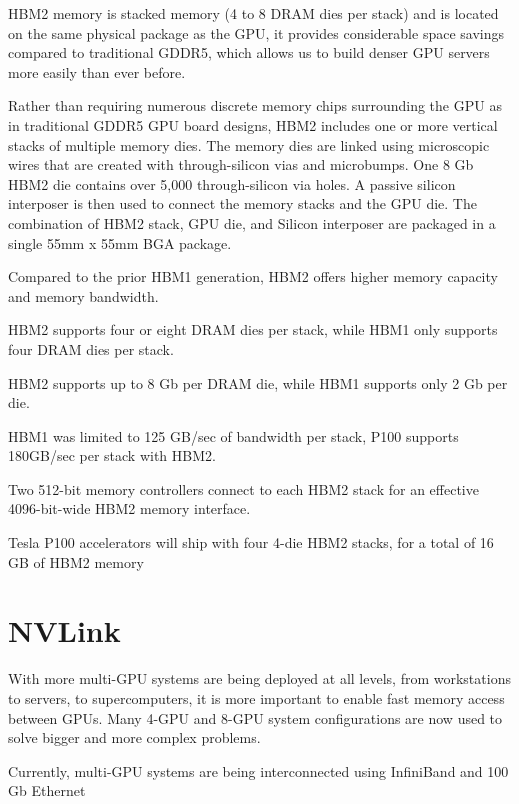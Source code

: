 HBM2 memory is stacked memory (4 to 8 DRAM dies per stack) and is located on the
same physical package as the GPU, it provides considerable space savings
compared to traditional GDDR5, which allows us to build denser GPU servers more
easily than ever before.

Rather than requiring numerous discrete memory chips surrounding the GPU as in
traditional GDDR5 GPU board designs, HBM2 includes one or more vertical stacks
of multiple memory dies. The memory dies are linked using microscopic wires that
are created with through-silicon vias and microbumps. One 8 Gb HBM2 die contains
over 5,000 through-silicon via holes.
A passive silicon interposer is then used to connect the memory stacks and the
GPU die. The combination of HBM2 stack, GPU die, and Silicon interposer are
packaged in a single 55mm x 55mm BGA package.


\begin{mdframed}


Compared to the prior HBM1 generation, HBM2 offers higher memory capacity and
memory bandwidth.

HBM2 supports four or eight DRAM dies per stack, while HBM1 only supports four
DRAM dies per stack.

HBM2 supports up to 8 Gb per DRAM die, while HBM1 supports only 2 Gb per die.

HBM1 was limited to 125 GB/sec of bandwidth per stack, P100 supports 180GB/sec
per stack with HBM2.

Two 512-bit memory controllers connect to each HBM2 stack for an effective
4096-bit-wide HBM2 memory interface.

Tesla P100 accelerators will ship with four 4-die HBM2 stacks, for a total of 16
GB of HBM2 memory

\end{mdframed}


\section{NVLink}
\label{sec:NVLink}

With more multi-GPU systems are being deployed at all levels, from workstations
to servers, to supercomputers, it is more important to enable fast memory access
between GPUs. Many 4-GPU and 8-GPU system configurations are now used to solve
bigger and more complex problems.

Currently, multi-GPU systems are being interconnected using InfiniBand and 100
Gb Ethernet

